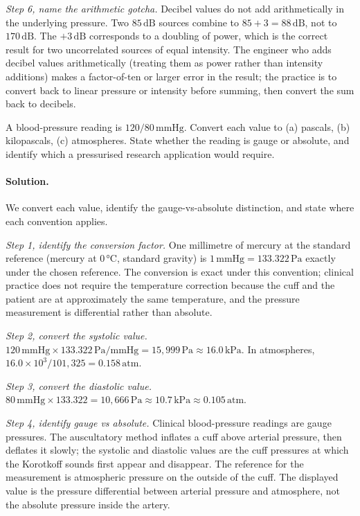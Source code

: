 \begin{exercise}
\textit{Step 6, name the arithmetic gotcha.} Decibel values do not
add arithmetically in the underlying pressure. Two
$85 \,\si{\deci\bel}$ sources combine to $85 + 3 = 88 \,\si{\deci\bel}$,
not to $170 \,\si{\deci\bel}$. The $+3 \,\si{\deci\bel}$ corresponds
to a doubling of power, which is the correct result for two
uncorrelated sources of equal intensity. The engineer who adds
decibel values arithmetically (treating them as power rather than
intensity additions) makes a factor-of-ten or larger error in the
result; the practice is to convert back to linear pressure or
intensity before summing, then convert the sum back to decibels.
\end{exercise}

\begin{exercise}
A blood-pressure reading is $120/80\,\text{mmHg}$. Convert
each value to (a) pascals, (b) kilopascals, (c) atmospheres. State
whether the reading is gauge or absolute, and identify which a
pressurised research application would require.

\paragraph{Solution.}
We convert each value, identify the gauge-vs-absolute distinction,
and state where each convention applies.

\textit{Step 1, identify the conversion factor.} One millimetre of
mercury at the standard reference (mercury at $0 \,\si{\degreeCelsius}$,
standard gravity) is $1 \,\text{mmHg} = 133.322 \,\si{\pascal}$
exactly under the chosen reference. The conversion is exact under
this convention; clinical practice does not require the temperature
correction because the cuff and the patient are at approximately
the same temperature, and the pressure measurement is differential
rather than absolute.

\textit{Step 2, convert the systolic value.}
$120 \,\text{mmHg} \times 133.322 \,\si{\pascal}/\text{mmHg} =
15{,}999 \,\si{\pascal} \approx 16.0 \,\si{\kilo\pascal}$. In
atmospheres, $16.0 \times 10^{3} / 101{,}325 = 0.158 \,\text{atm}$.

\textit{Step 3, convert the diastolic value.}
$80 \,\text{mmHg} \times 133.322 = 10{,}666 \,\si{\pascal} \approx
10.7 \,\si{\kilo\pascal} \approx 0.105 \,\text{atm}$.

\textit{Step 4, identify gauge vs absolute.} Clinical blood-pressure
readings are gauge pressures. The auscultatory method inflates a
cuff above arterial pressure, then deflates it slowly; the systolic
and diastolic values are the cuff pressures at which the Korotkoff
sounds first appear and disappear. The reference for the
measurement is atmospheric pressure on the outside of the cuff. The
displayed value is the pressure differential between arterial
pressure and atmosphere, not the absolute pressure inside the
artery.


\end{exercise}
